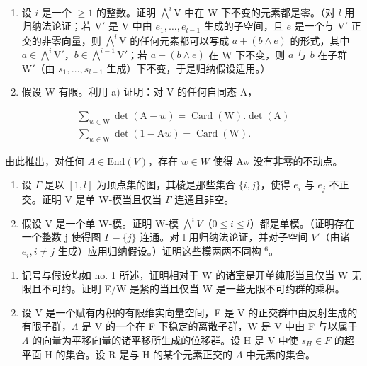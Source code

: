 \begin{enumerate}
\def\labelenumi{\alph{enumi})}
\item
  设 \(i\) 是一个 \(\geqslant 1\) 的整数。证明 \(\bigwedge^{i}\mathrm{V}\) 中在 W 下不变的元素都是零。（对 \(l\) 用归纳法论证；若 \(\mathrm{V}'\) 是 V 中由 \(e_1, \ldots, e_{l-1}\) 生成的子空间，且 \(e\) 是一个与 \(\mathrm{V}'\) 正交的非零向量，则 \(\bigwedge^{i}\mathrm{V}\) 的任何元素都可以写成 \(a + (b \wedge e)\) 的形式，其中 \(a \in \bigwedge^{i}\mathrm{V}'\)，\(b \in \bigwedge^{i-1}\mathrm{V}'\)；若 \(a + (b \wedge e)\) 在 W 下不变，则 \(a\) 与 \(b\) 在子群 \(\mathrm{W}'\)（由 \(s_1, \ldots, s_{l-1}\) 生成）下不变，于是归纳假设适用。）
\item
  假设 W 有限。利用 a) 证明：对 V 的任何自同态 A，
\end{enumerate}

\[
\begin{array}{c} \sum_ {w \in \mathrm{W}} \det (\mathrm{A} - w) = \operatorname{Card} (\mathrm{W}). \det (\mathrm{A}) \\ \sum_ {w \in \mathrm{W}} \det (1 - \mathrm{A} w) = \operatorname{Card} (\mathrm{W}). \end{array}
\]

由此推出，对任何 \(A \in \text{End}(V)\)，存在 \(w \in W\) 使得 Aw 没有非零的不动点。

\begin{enumerate}
\def\labelenumi{\alph{enumi})}
\setcounter{enumi}{2}
\item
  设 \(\Gamma\) 是以 \([1,l]\) 为顶点集的图，其棱是那些集合 \(\{i,j\}\)，使得 \(e_{i}\) 与 \(e_{j}\) 不正交。证明 V 是单 W-模当且仅当 \(\Gamma\) 连通且非空。
\item
  假设 V 是一个单 W-模。证明 W-模 \(\bigwedge^{i}V\)（\(0 \leqslant i \leqslant l\)）都是单模。（证明存在一个整数 j 使得图 \(\Gamma - \{j\}\) 连通。对 l 用归纳法论证，并对子空间 \(V'\)（由诸 \(e_{i}, i \neq j\) 生成）应用归纳假设。）证明这些模两两不同构 \(^{6}\)。
\end{enumerate}


\begin{enumerate}
\def\labelenumi{\arabic{enumi})}
\item
  记号与假设均如 no. 1 所述，证明相对于 W 的诸室是开单纯形当且仅当 W 无限且不可约。证明 E/W 是紧的当且仅当 W 是一些无限不可约群的乘积。
\item
  设 V 是一个赋有内积的有限维实向量空间，F 是 V 的正交群中由反射生成的有限子群，\(\Lambda\) 是 V 的一个在 F 下稳定的离散子群，W 是 V 中由 F 与以属于 \(\Lambda\) 的向量为平移向量的诸平移所生成的位移群。设 H 是 V 中使 \(s_{H} \in F\) 的超平面 H 的集合。设 R 是与 H 的某个元素正交的 \(\Lambda\) 中元素的集合。
\end{enumerate}

